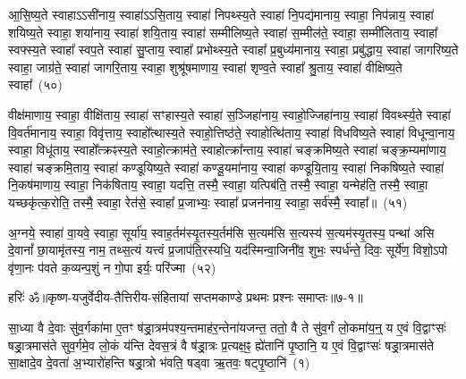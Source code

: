 आ॒सि॒ष्य॒ते स्वाहा\-ऽऽ\-सी॑नाय॒ स्वाहा॑\-ऽऽ\-सि॒ताय॒ स्वाहा॑ निपथ्स्य॒ते स्वाहा॑ नि॒पद्य॑मानाय॒ स्वाहा॒ निप॑न्नाय॒ स्वाहा॑ शयिष्य॒ते स्वाहा॒ शया॑नाय॒ स्वाहा॑ शयि॒ताय॒ स्वाहा॑ सम्मीलिष्य॒ते स्वाहा॑ स॒म्मील॑ते॒ स्वाहा॒ सम्मी॑लिताय॒ स्वाहा᳚ स्वफ्स्य॒ते स्वाहा᳚ स्वप॒ते स्वाहा॑ सु॒प्ताय॒ स्वाहा᳚ प्रभोथ्स्य॒ते स्वाहा᳚ प्र॒बुध्य॑मानाय॒ स्वाहा॒ प्रबु॑द्धाय॒ स्वाहा॑ जागरिष्य॒ते स्वाहा॒ जाग्र॑ते॒ स्वाहा॑ जागरि॒ताय॒ स्वाहा॒ शुश्रू॑षमाणाय॒ स्वाहा॑ शृण्व॒ते स्वाहा᳚ श्रु॒ताय॒ स्वाहा॑ वीक्षिष्य॒ते स्वाहा᳚~(५०)\ip

वीक्ष॑माणाय॒ स्वाहा॒ वीक्षि॑ताय॒ स्वाहा॑ सꣳहास्य॒ते स्वाहा॑ स॒ञ्जिहा॑नाय॒ स्वाहो॒ज्जिहा॑नाय॒ स्वाहा॑ विवर्थ्स्य॒ते स्वाहा॑ वि॒वर्त॑मानाय॒ स्वाहा॒ विवृ॑त्ताय॒ स्वाहो᳚त्थास्य॒ते स्वाहो॒त्तिष्ठ॑ते॒ स्वाहोत्थि॑ताय॒ स्वाहा॑ विधविष्य॒ते स्वाहा॑ विधून्वा॒नाय॒ स्वाहा॒ विधू॑ताय॒ स्वाहो᳚त्क्रꣴस्य॒ते स्वाहो॒त्क्राम॑ते॒ स्वाहोत्क्रा᳚न्ताय॒ स्वाहा॑ चङ्क्रमिष्य॒ते स्वाहा॑ चङ्क्र॒म्यमा॑णाय॒ स्वाहा॑ चङ्क्रमि॒ताय॒ स्वाहा॑ कण्डूयिष्य॒ते स्वाहा॑ कण्डू॒यमा॑नाय॒ स्वाहा॑ कण्डूयि॒ताय॒ स्वाहा॑ निकषिष्य॒ते स्वाहा॑ नि॒कष॑माणाय॒ स्वाहा॒ निक॑षिताय॒ स्वाहा॒ यदत्ति॒ तस्मै॒ स्वाहा॒ यत्पिब॑ति॒ तस्मै॒ स्वाहा॒ यन्मेह॑ति॒ तस्मै॒ स्वाहा॒ यच्छकृ॑त्क॒रोति॒ तस्मै॒ स्वाहा॒ रेत॑से॒ स्वाहा᳚ प्र॒जाभ्यः॒ स्वाहा᳚ प्रजन॑नाय॒ स्वाहा॒ सर्व॑स्मै॒ स्वाहा᳚॥~(५१)\ip

{\anuvakamend[{}]}

अ॒ग्नये॒ स्वाहा॑ वा॒यवे॒ स्वाहा॒ सूर्या॑य॒ स्वाह॒र्तम॑स्यृ॒तस्य॒र्तम॑सि स॒त्यम॑सि स॒त्यस्य॑ स॒त्यम॑स्यृ॒तस्य॒ पन्था॑ असि दे॒वानां᳚ छा॒यामृ॑तस्य॒ नाम॒ तथ्स॒त्यं यत्त्वं प्र॒जा\-प॑ति॒रस्यधि॒ यद॑स्मिन्वा॒जिनी॑व॒ शुभः॒ स्पर्ध॑न्ते॒ दिवः॒ सूर्ये॑ण॒ विशो॒\-ऽपो वृ॑णा॒नः प॑वते क॒व्यन्प॒शुं न गो॒पा इर्यः॒ परि॑ज्मा~(५२)\ip


{हरिः॑ ॐ}{॥कृष्ण-यजुर्वेदीय-तैत्तिरीय-संहितायां सप्तमकाण्डे प्रथमः प्रश्नः समाप्तः॥७-१॥}



\setcounter{anuvakam}{0}
सा॒ध्या वै दे॒वाः सु॑व॒र्गका॑मा ए॒तꣳ ष॑ड्रा॒त्रम॑पश्य॒न्तमाह॑र॒न्तेना॑यजन्त॒ ततो॒ वै ते सु॑व॒र्गं लो॒कमा॑य॒न्॒ य ए॒वं वि॒द्वाꣳसः॑ षड्रा॒त्रमास॑ते सुव॒र्गमे॒व लो॒कं य॑न्ति देवस॒त्रं वै ष॑ड्रा॒त्रः प्र॒त्यक्ष॒ꣴ॒ ह्ये॑तानि॑ पृ॒ष्ठानि॒ य ए॒वं वि॒द्वाꣳसः॑ षड्रा॒त्रमास॑ते सा॒क्षादे॒व दे॒वता॑ अ॒भ्यारो॑हन्ति षड्रा॒त्रो भ॑वति॒ षड्वा ऋ॒तवः॒ षट्पृ॒ष्ठानि॑~(१)\ip

